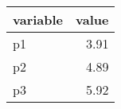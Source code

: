 \begin{tabular}{lr}
  \hline
variable & value \\ 
  \hline
p1 & 3.91 \\ 
  p2 & 4.89 \\ 
  p3 & 5.92 \\ 
   \hline
\end{tabular}
